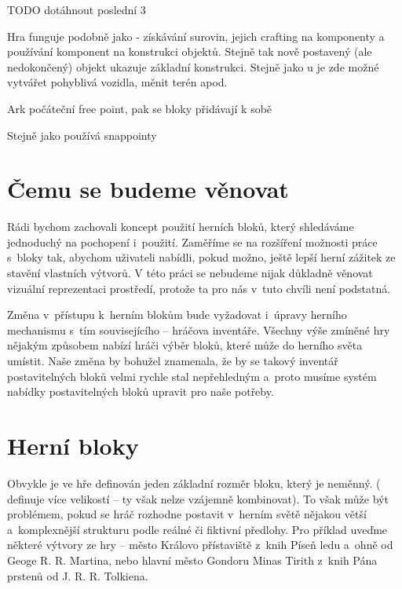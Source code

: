TODO dotáhnout poslední 3

Hra \PN{} funguje podobně jako \SE - získávání surovin, jejich crafting na komponenty a používání komponent na konstrukci objektů. Stejně tak nově postavený (ale nedokončený) objekt ukazuje základní konstrukci. Stejně jako u \SE{} je zde možné vytvářet pohyblivá vozidla, měnit terén apod. 


\ARK{}
Ark počáteční free point, pak se bloky přidávají k sobě


\NMS{}
Stejně jako \TM{} používá snappointy

\section{Čemu se budeme věnovat}

Rádi bychom zachovali koncept použití herních bloků, který shledáváme jednoduchý na pochopení i~použití. Zaměříme se na rozšíření možnosti práce s~bloky tak, abychom uživateli nabídli, pokud možno, ještě lepší herní zážitek ze stavění vlastních výtvorů. V této práci se nebudeme nijak důkladně věnovat vizuální reprezentaci prostředí, protože ta pro nás v~tuto chvíli není podstatná. 

Změna v~přístupu k~herním blokům bude vyžadovat i~úpravy herního mechanismu s~tím souvisejícího -- hráčova inventáře. Všechny výše zmíněné hry nějakým způsobem nabízí hráči výběr bloků, které může do herního světa umístit. Naše změna by bohužel znamenala, že by se takový inventář postavitelných bloků velmi rychle stal nepřehledným a~proto musíme systém nabídky postavitelných bloků upravit pro naše potřeby.

\section{Herní bloky}



Obvykle je ve hře definován jeden základní rozměr bloku, který je neměnný. (\SE{} definuje více velikostí -- ty však nelze vzájemně kombinovat). To však může být problémem, pokud se hráč rozhodne postavit v~herním světě nějakou větší a~komplexnější strukturu podle reálné či fiktivní předlohy. Pro příklad uveďme některé výtvory ze hry \MC{} -- město Královo přístaviště z~knih Píseň ledu a~ohně od Geoge R. R. Martina, nebo hlavní město Gondoru Minas Tirith z~knih Pána prstenů od J. R. R. Tolkiena.

